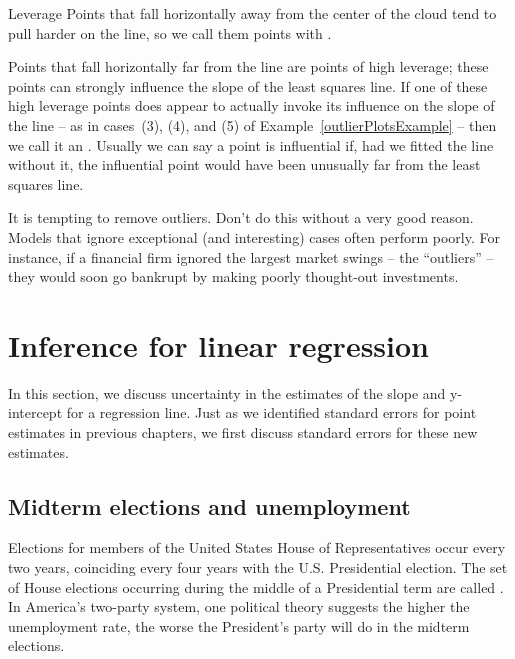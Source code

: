 \begin{onebox}{Leverage}
  Points that fall horizontally away from the center of the
  cloud tend to pull harder on the line, so we call them points
  with .
\end{onebox}

Points that fall horizontally far from the line are points
of high leverage;
these points can strongly influence the slope of the least
squares line.
If one of these high leverage points does appear to actually
invoke its influence on the slope of the line --
as in cases~(3), (4), and (5) of Example~\ref{outlierPlotsExample}
-- then we call it an .
Usually we can say a point is influential if, had we fitted
the line without it, the influential point would have been
unusually far from the least squares line.

It is tempting to remove outliers.
Don't do this without a very good reason.
Models that ignore exceptional (and interesting) cases often
perform poorly.
For instance, if a financial firm ignored the largest market
swings -- the ``outliers'' --  they would soon go bankrupt
by making poorly thought-out investments.


{}








\section{Inference for linear regression}
\label{inferenceForLinearRegression}

In this section, we discuss uncertainty in the estimates
of the slope and y-intercept for a regression line.
Just as we identified standard errors for point estimates
in previous chapters, we first discuss standard errors for
these new estimates.


\subsection{Midterm elections and unemployment}


Elections for members of the United States House
of Representatives occur every two years, coinciding
every four years with the U.S. Presidential election.
The set of House elections occurring during the middle
of a Presidential term are called
.
In America's two-party system, one political theory
suggests the higher the unemployment rate, the worse
the President's party will do in the midterm elections.

